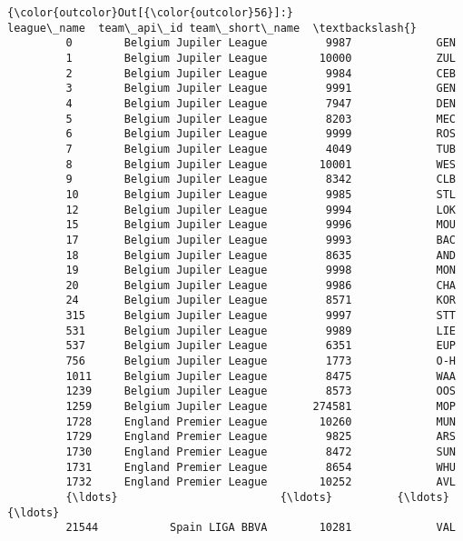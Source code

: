 \documentclass[11pt]{article}
\begin{document}
\begin{Verbatim}[commandchars=\\\{\}]
{\color{outcolor}Out[{\color{outcolor}56}]:}                     league\_name  team\_api\_id team\_short\_name  \textbackslash{}
         0        Belgium Jupiler League         9987             GEN   
         1        Belgium Jupiler League        10000             ZUL   
         2        Belgium Jupiler League         9984             CEB   
         3        Belgium Jupiler League         9991             GEN   
         4        Belgium Jupiler League         7947             DEN   
         5        Belgium Jupiler League         8203             MEC   
         6        Belgium Jupiler League         9999             ROS   
         7        Belgium Jupiler League         4049             TUB   
         8        Belgium Jupiler League        10001             WES   
         9        Belgium Jupiler League         8342             CLB   
         10       Belgium Jupiler League         9985             STL   
         12       Belgium Jupiler League         9994             LOK   
         15       Belgium Jupiler League         9996             MOU   
         17       Belgium Jupiler League         9993             BAC   
         18       Belgium Jupiler League         8635             AND   
         19       Belgium Jupiler League         9998             MON   
         20       Belgium Jupiler League         9986             CHA   
         24       Belgium Jupiler League         8571             KOR   
         315      Belgium Jupiler League         9997             STT   
         531      Belgium Jupiler League         9989             LIE   
         537      Belgium Jupiler League         6351             EUP   
         756      Belgium Jupiler League         1773             O-H   
         1011     Belgium Jupiler League         8475             WAA   
         1239     Belgium Jupiler League         8573             OOS   
         1259     Belgium Jupiler League       274581             MOP   
         1728     England Premier League        10260             MUN   
         1729     England Premier League         9825             ARS   
         1730     England Premier League         8472             SUN   
         1731     England Premier League         8654             WHU   
         1732     England Premier League        10252             AVL   
         {\ldots}                         {\ldots}          {\ldots}             {\ldots}   
         21544           Spain LIGA BBVA        10281             VAL   

\end{Verbatim}
\end{document}
